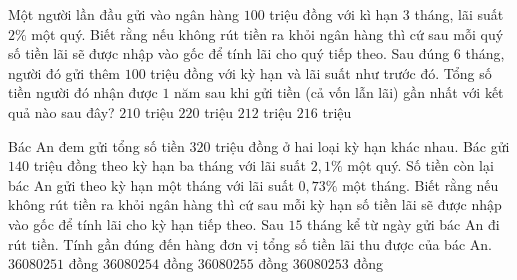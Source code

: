 \begin{ex}%
	Một người lần đầu gửi vào ngân hàng $100$ triệu đồng với kì hạn 3 tháng, lãi suất $2\%$ một quý. Biết rằng nếu không rút tiền ra khỏi ngân hàng thì cứ sau mỗi quý số tiền lãi sẽ được nhập vào gốc để tính lãi cho quý tiếp theo. Sau đúng $6$ tháng, người đó gửi thêm $100$ triệu đồng với kỳ hạn và lãi suất như trước đó. Tổng số tiền người đó nhận được $1$ năm sau khi gửi tiền (cả vốn lẫn lãi) gần nhất với kết quả nào sau đây?
	\choice
	{$210$ triệu}
	{$220$ triệu}
	{\True $212$ triệu}
	{$216$ triệu}
\end{ex}
\begin{ex}%
	Bác An đem gửi tổng số tiền $320$ triệu đồng ở hai loại kỳ hạn khác nhau. Bác gửi $140$ triệu đồng theo kỳ hạn ba tháng với lãi suất $2,1\%$ một quý. Số tiền còn lại bác An gửi theo kỳ hạn một tháng với lãi suất $0,73\%$ một tháng. Biết rằng nếu không rút tiền ra khỏi ngân hàng thì cứ sau mỗi kỳ hạn số tiền lãi sẽ được nhập vào gốc để tính lãi cho kỳ hạn tiếp theo. Sau $15$ tháng kể từ ngày gửi bác An đi rút tiền. Tính gần đúng đến hàng đơn vị tổng số tiền lãi thu được của bác An. 
	\choice
	{$36080251$ đồng}
	{$36080254$ đồng}
	{$36080255$ đồng}
	{\True $36080253$ đồng}
\end{ex}
